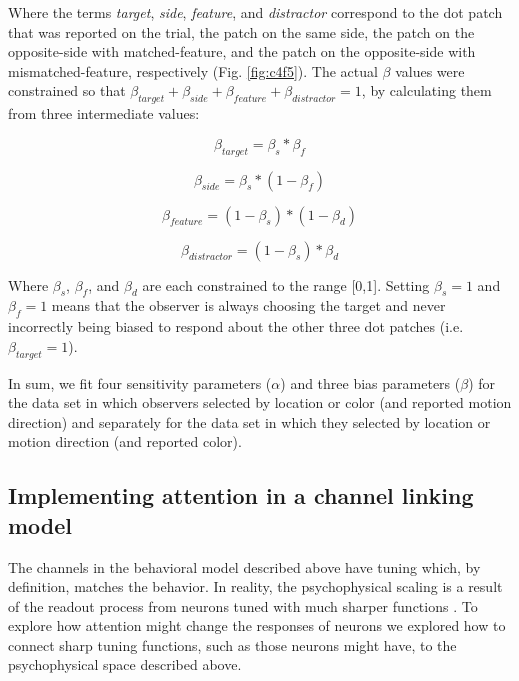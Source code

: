 Where the terms \textit{target}, \textit{side}, \textit{feature}, and \textit{distractor} correspond to the dot patch that was reported on the trial, the patch on the same side, the patch on the opposite-side with matched-feature, and the patch on the opposite-side with mismatched-feature, respectively (Fig. \ref{fig:c4f5}). The actual $\beta$ values were constrained so that $\beta_{target}+\beta_{side}+\beta_{feature}+\beta_{distractor}=1$, by calculating them from three intermediate values:

\begin{equation}
    \beta_{target} = \beta_{s} * \beta_{f}
\end{equation}

\begin{equation}
    \beta_{side} = \beta_{s} * (1-\beta_{f})
\end{equation}

\begin{equation}
    \beta_{feature} = (1-\beta_{s}) * (1-\beta_{d})
\end{equation}

\begin{equation}
    \beta_{distractor} = (1-\beta_{s}) * \beta_{d}
\end{equation}

Where $\beta_s$, $\beta_f$, and $\beta_d$ are each constrained to the range [0,1]. Setting $\beta_s=1$ and $\beta_f=1$ means that the observer is always choosing the target and never incorrectly being biased to respond about the other three dot patches (i.e. $\beta_{target}=1$).

In sum, we fit four sensitivity parameters ($\alpha$) and three bias parameters ($\beta$) for the data set in which observers selected by location or color (and reported motion direction) and separately for the data set in which they selected by location or motion direction (and reported color).

\subsection{Implementing attention in a channel linking model}

The channels in the behavioral model described above have tuning which, by definition, matches the behavior. In reality, the psychophysical scaling is a result of the readout process from neurons tuned with much sharper functions \citep{Bays2014-ym,Bays2019-ni}. To explore how attention might change the responses of neurons we explored how to connect sharp tuning functions, such as those neurons might have, to the psychophysical space described above.

